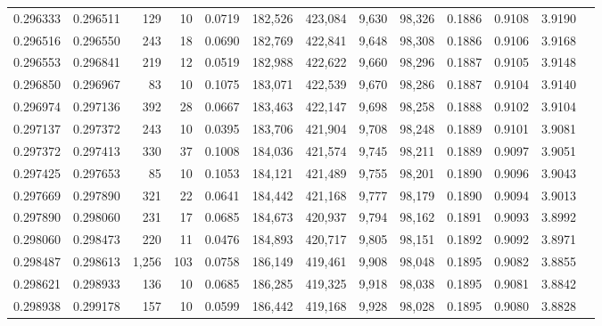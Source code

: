 \begin{tabular}{rrrrrrrrrrrrr}
0.296333 & 0.296511 &   129 &  10 &                                     0.0719 & 182,526 & 423,084 &   9,630 &  98,326 & 0.1886 & 0.9108 & 3.9190 \\
0.296516 & 0.296550 &   243 &  18 &                                     0.0690 & 182,769 & 422,841 &   9,648 &  98,308 & 0.1886 & 0.9106 & 3.9168 \\
0.296553 & 0.296841 &   219 &  12 &                                     0.0519 & 182,988 & 422,622 &   9,660 &  98,296 & 0.1887 & 0.9105 & 3.9148 \\
0.296850 & 0.296967 &    83 &  10 &                                     0.1075 & 183,071 & 422,539 &   9,670 &  98,286 & 0.1887 & 0.9104 & 3.9140 \\
0.296974 & 0.297136 &   392 &  28 &                                     0.0667 & 183,463 & 422,147 &   9,698 &  98,258 & 0.1888 & 0.9102 & 3.9104 \\
0.297137 & 0.297372 &   243 &  10 &                                     0.0395 & 183,706 & 421,904 &   9,708 &  98,248 & 0.1889 & 0.9101 & 3.9081 \\
0.297372 & 0.297413 &   330 &  37 &                                     0.1008 & 184,036 & 421,574 &   9,745 &  98,211 & 0.1889 & 0.9097 & 3.9051 \\
0.297425 & 0.297653 &    85 &  10 &                                     0.1053 & 184,121 & 421,489 &   9,755 &  98,201 & 0.1890 & 0.9096 & 3.9043 \\
0.297669 & 0.297890 &   321 &  22 &                                     0.0641 & 184,442 & 421,168 &   9,777 &  98,179 & 0.1890 & 0.9094 & 3.9013 \\
0.297890 & 0.298060 &   231 &  17 &                                     0.0685 & 184,673 & 420,937 &   9,794 &  98,162 & 0.1891 & 0.9093 & 3.8992 \\
0.298060 & 0.298473 &   220 &  11 &                                     0.0476 & 184,893 & 420,717 &   9,805 &  98,151 & 0.1892 & 0.9092 & 3.8971 \\
0.298487 & 0.298613 & 1,256 & 103 &                                     0.0758 & 186,149 & 419,461 &   9,908 &  98,048 & 0.1895 & 0.9082 & 3.8855 \\
0.298621 & 0.298933 &   136 &  10 &                                     0.0685 & 186,285 & 419,325 &   9,918 &  98,038 & 0.1895 & 0.9081 & 3.8842 \\
0.298938 & 0.299178 &   157 &  10 &                                     0.0599 & 186,442 & 419,168 &   9,928 &  98,028 & 0.1895 & 0.9080 & 3.8828 \\

\end{tabular}
